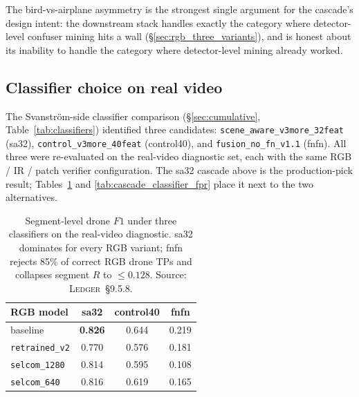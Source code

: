 \documentclass[12pt,a4paper,oneside,openright]{book}
\begin{document}
The bird-vs-airplane asymmetry is the strongest single argument for the cascade's design intent: the downstream stack handles exactly the category where detector-level confuser mining hits a wall (\S\ref{sec:rgb_three_variants}), and is honest about its inability to handle the category where detector-level mining already worked.

\subsection{Classifier choice on real video}
\label{sec:realvideo_classifier}

The Svanstr\"om-side classifier comparison (\S\ref{sec:cumulative}, Table~\ref{tab:classifiers}) identified three candidates: \texttt{scene\_aware\_v3more\_32feat} (sa32), \texttt{control\_v3more\_40feat} (control40), and \texttt{fusion\_no\_fn\_v1.1} (fnfn). All three were re-evaluated on the real-video diagnostic set, each with the same RGB / IR / patch verifier configuration. The sa32 cascade above is the production-pick result; Tables~\ref{tab:cascade_classifier_drone} and \ref{tab:cascade_classifier_fpr} place it next to the two alternatives.

\begin{table}[htbp]
    \centering
    \caption{Segment-level drone $F1$ under three classifiers on the real-video diagnostic. sa32 dominates for every RGB variant; fnfn rejects 85\% of correct RGB drone TPs and collapses segment $R$ to $\leq 0.128$. Source: \textsc{Ledger}~\S9.5.8.}
    \label{tab:cascade_classifier_drone}
    \begin{tabular}{lccc}
        \toprule
        RGB model & sa32 & control40 & fnfn \\
        \midrule
        baseline           & \textbf{0.826} & 0.644 & 0.219 \\
        \texttt{retrained\_v2} & 0.770 & 0.576 & 0.181 \\
        \texttt{selcom\_1280}  & 0.814 & 0.595 & 0.108 \\
        \texttt{selcom\_640}   & 0.816 & 0.619 & 0.165 \\
        \bottomrule
    \end{tabular}
\end{table}
\end{document}
